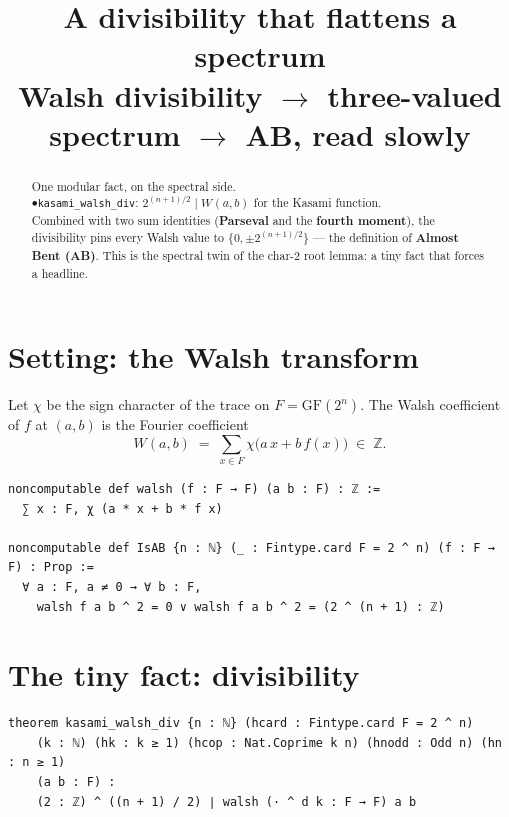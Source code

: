 \documentclass[11pt]{article}
\title{\textbf{A divisibility that flattens a spectrum}\\[4pt]
\large Walsh divisibility $\to$ three-valued spectrum $\to$ AB, read slowly}
\author{}
\date{}
\begin{document}
\maketitle

\begin{abstract}
\noindent
One modular fact, on the spectral side.\\[2pt]
$\bullet$\quad \texttt{kasami\_walsh\_div}:\;\;
$2^{(n+1)/2}\mid W(a,b)$ for the Kasami function.\\[6pt]
\noindent
Combined with two sum identities (\textbf{Parseval} and the \textbf{fourth
moment}), the divisibility pins every Walsh value to $\{0,\pm 2^{(n+1)/2}\}$ ---
the definition of \textbf{Almost Bent (AB)}. This is the spectral twin of the
char-2 root lemma: a tiny fact that forces a headline.
\end{abstract}

\bigskip

\section*{Setting: the Walsh transform}

\noindent
Let $\chi$ be the sign character of the trace on $F=\mathrm{GF}(2^n)$. The Walsh
coefficient of $f$ at $(a,b)$ is the Fourier coefficient
\[
W(a,b)\;=\;\sum_{x\in F}\chi\bigl(a\,x+b\,f(x)\bigr)\;\in\;\mathbb{Z}.
\]

\begin{lstlisting}
noncomputable def walsh (f : F → F) (a b : F) : ℤ :=
  ∑ x : F, χ (a * x + b * f x)

noncomputable def IsAB {n : ℕ} (_ : Fintype.card F = 2 ^ n) (f : F → F) : Prop :=
  ∀ a : F, a ≠ 0 → ∀ b : F,
    walsh f a b ^ 2 = 0 ∨ walsh f a b ^ 2 = (2 ^ (n + 1) : ℤ)
\end{lstlisting}


\bigskip

\section{The tiny fact: divisibility}

\begin{lstlisting}
theorem kasami_walsh_div {n : ℕ} (hcard : Fintype.card F = 2 ^ n)
    (k : ℕ) (hk : k ≥ 1) (hcop : Nat.Coprime k n) (hnodd : Odd n) (hn : n ≥ 1)
    (a b : F) :
    (2 : ℤ) ^ ((n + 1) / 2) ∣ walsh (· ^ d k : F → F) a b
\end{lstlisting}
\end{document}
